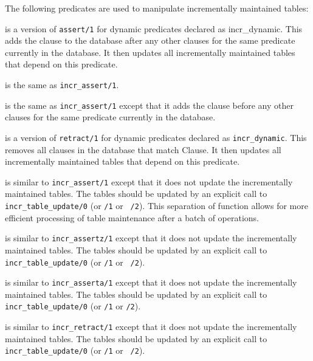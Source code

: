 The following predicates are used to manipulate incrementally
maintained tables:

\begin{description}
is a version of {\tt assert/1} for dynamic predicates declared as
incr\_dynamic.  This adds the clause to the database after any other
clauses for the same predicate currently in the database.  It then
updates all incrementally maintained tables that depend on this
predicate.

is the same as {\tt incr\_assert/1}.

is the same as {\tt incr\_assert/1} except that it adds the clause
before any other clauses for the same predicate currently in the
database.

is a version of {\tt retract/1} for dynamic predicates declared as
{\tt incr\_dynamic}.  This removes all clauses in the database that
match Clause.  It then updates all incrementally maintained tables
that depend on this predicate.

is similar to {\tt incr\_assert/1} except that it does not update the
incrementally maintained tables.  The tables should be updated by an
explicit call to {\tt incr\_table\_update/0} (or {\tt /1} or {\tt
/2}).  This separation of function allows for more efficient
processing of table maintenance after a batch of operations.

is similar to {\tt incr\_assertz/1} except that it does not update the
incrementally maintained tables.  The tables should be updated by an
explicit call to {\tt incr\_table\_update/0} (or {\tt /1} or {\tt
/2}).

is similar to {\tt incr\_asserta/1} except that it does not update the
incrementally maintained tables.  The tables should be updated by an
explicit call to {\tt incr\_table\_update/0} (or {\tt /1} or {\tt /2}).

is similar to {\tt incr\_retract/1} except that it does not update the
incrementally maintained tables.  The tables should be updated by an
explicit call to {\tt incr\_table\_update/0} (or {\tt /1} or {\tt
/2}).


\end{description}
